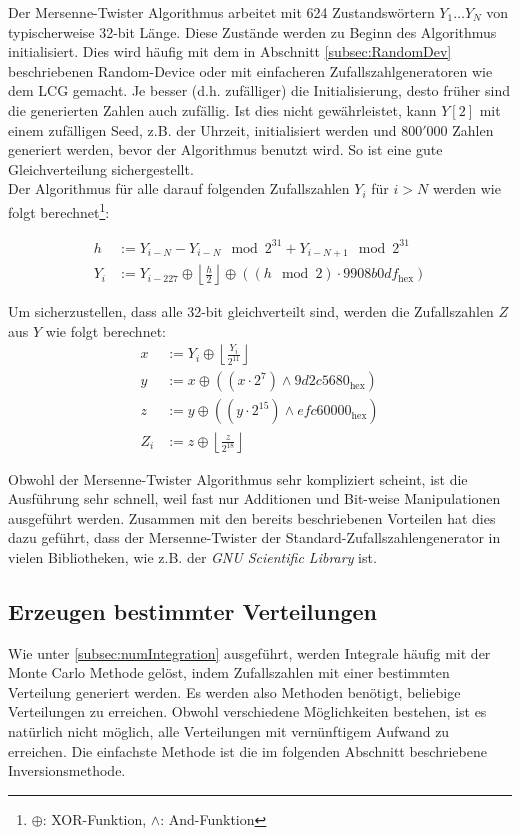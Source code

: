 \documentclass{book}
\begin{document}
\begin{refsection}
Der Mersenne-Twister Algorithmus arbeitet mit 624 Zustandswörtern $Y_1 \dots Y_N$ von typischerweise 32-bit Länge. Diese Zustände werden zu Beginn des Algorithmus initialisiert. Dies wird häufig mit dem in Abschnitt \ref{subsec:RandomDev} beschriebenen Random-Device oder mit einfacheren Zufallszahlgeneratoren wie dem LCG gemacht. Je besser (d.h. zufälliger) die Initialisierung, desto früher sind die generierten Zahlen auch zufällig. Ist dies nicht gewährleistet, kann $Y[2]$ mit einem zufälligen Seed, z.B. der Uhrzeit, initialisiert werden und $800'000$ Zahlen generiert werden, bevor der Algorithmus benutzt wird. So ist eine gute Gleichverteilung sichergestellt. \\

Der Algorithmus für alle darauf folgenden Zufallszahlen $Y_i$ für
$i>N$ werden wie folgt berechnet\footnote{$\oplus$: XOR-Funktion, $\wedge$: And-Funktion}:

\begin{align}
	h &:=  Y_{i-N} - Y_{i-N} \mod{2^{31}} + Y_{i-N+1} \mod{2^{31}} \\
	Y_i &:= Y_{i-227} \oplus \left\lfloor \frac{h}{2} \right\rfloor \oplus \left( \left(h \mod{2} \right) \cdot 9908b0df_{\text{hex}}\right)
\end{align}

Um sicherzustellen, dass alle 32-bit gleichverteilt sind, werden die Zufallszahlen $Z$ aus $Y$ wie folgt berechnet: 
\begin{align}
	x &:= Y_{i} \oplus \left\lfloor \frac{Y_i}{2^{11}} \right\rfloor \\
	y &:= x \oplus \left(\left(x \cdot 2^7\right) \wedge 9d2c5680_{\text{hex}} \right) \\
	z &:= y \oplus \left(\left(y \cdot 2^{15}\right) \wedge efc60000_{\text{hex}} \right) \\
	Z_i &:= z \oplus \left\lfloor \frac{z}{2^{18}} \right\rfloor
\end{align}

Obwohl der Mersenne-Twister Algorithmus sehr kompliziert scheint, ist die Ausführung sehr schnell, weil fast nur Additionen und Bit-weise Manipulationen ausgeführt werden. Zusammen mit den bereits beschriebenen Vorteilen hat dies dazu geführt, dass der Mersenne-Twister der Standard-Zufallszahlengenerator in vielen Bibliotheken, wie z.B. der \textit{GNU Scientific Library} ist.


\subsection{Erzeugen bestimmter Verteilungen}
Wie unter \ref{subsec:numIntegration} ausgeführt, werden Integrale häufig mit der Monte Carlo Methode gelöst, indem Zufallszahlen mit einer bestimmten Verteilung generiert werden. Es werden also Methoden benötigt, beliebige Verteilungen zu erreichen. Obwohl verschiedene Möglichkeiten bestehen, ist es natürlich nicht möglich, alle Verteilungen mit vernünftigem Aufwand zu erreichen. Die einfachste Methode ist die im folgenden Abschnitt beschriebene Inversionsmethode. 


\end{refsection}
\end{document}
